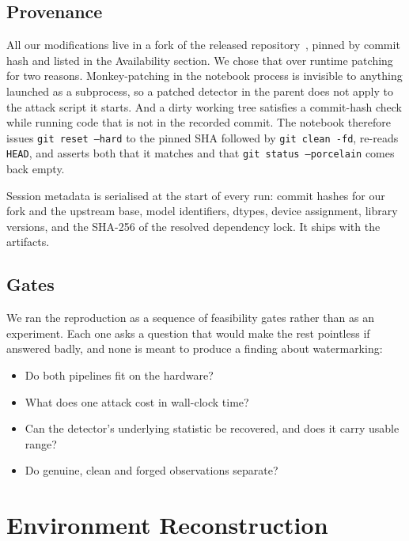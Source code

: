 \documentclass[10pt,twocolumn]{article}
\newcommand{\code}[1]{\texttt{\small #1}}
\begin{document}
\subsection{Provenance}

All our modifications live in a fork of the released
repository~\cite{semanticforgery-repo}, pinned by commit hash and listed in the
Availability section. We chose that over
runtime patching for two reasons. Monkey-patching in the notebook process is invisible
to anything launched as a subprocess, so a patched detector in the parent does not
apply to the attack script it starts. And a dirty working tree satisfies a commit-hash
check while running code that is not in the recorded commit. The notebook therefore
issues \code{git reset --hard} to the pinned SHA followed by \code{git clean -fd},
re-reads \code{HEAD}, and asserts both that it matches and that
\code{git status --porcelain} comes back empty.

Session metadata is serialised at the start of every run: commit hashes for our fork
and the upstream base, model identifiers, dtypes, device assignment, library versions,
and the SHA-256 of the resolved dependency lock. It ships with the artifacts.

\subsection{Gates}

We ran the reproduction as a sequence of feasibility gates rather than as an
experiment. Each one asks a question that would make the rest pointless if answered
badly, and none is meant to produce a finding about watermarking:

\begin{itemize}\itemsep2pt
\item[\textbf{G1}] Do both pipelines fit on the hardware?
\item[\textbf{G2}] What does one attack cost in wall-clock time?
\item[\textbf{G3}] Can the detector's underlying statistic be recovered, and does it
      carry usable range?
\item[\textbf{G4}] Do genuine, clean and forged observations separate?
\end{itemize}

\section{Environment Reconstruction}
\label{sec:env}
\end{document}
